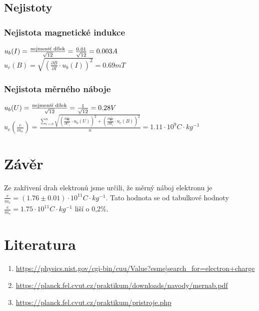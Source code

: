 \documentclass[11pt, a4paper]{report}
\begin{document}
\section{Nejistoty}
\subsection{Nejistota magnetické indukce}
\begin{center}
	\Large
	$u_b(I) = \frac{\textnormal{nejmenší dílek}}{\sqrt{12}}=\frac{0.01}{\sqrt{12}} = 0.003A$\\
	\vspace{0.2cm}
	$u_c(B) = \sqrt{(\frac{\partial B}{\partial I}\cdot u_b(I))^2}=0.69 mT$\\
\end{center}
\subsection{Nejistota měrného náboje}
\begin{center}
	\Large
	$u_b(U) = \frac{\textnormal{nejmenší dílek}}{\sqrt{12}}=\frac{1}{\sqrt{12}} = 0.28V$\\
	\vspace{0.5cm}
	\LARGE
	$u_c(\frac{e}{m_e})=\frac{\sum_{i=0}^{n}\sqrt{(\frac{\partial \frac{e}{m_e}}{\partial U_i}\cdot u_b(U))^2+(\frac{\partial \frac{e}{m_e}}{\partial B_i }\cdot u_c(B))^2}}{n}= 1.11\cdot 10^{9} C\cdot kg^{-1}$
\end{center}
\chapter{Závěr}
Ze zakřivení drah elektronů jsme určili, že měrný náboj elektronu je \mbox{$\frac{e}{m_e} = (1.76\pm0.01) \cdot 10^{11} C\cdot kg^{-1}$}.
Tato hodnota se od tabulkové hodnoty $\frac{e}{m_e} = 1.75\cdot 10^{11} C\cdot kg^{-1}$ liší o 0,2\%.

\chapter{Literatura}
\begin{enumerate}
	\item \url{https://physics.nist.gov/cgi-bin/cuu/Value?esme|search_for=electron+charge}
	\item \url{https://planck.fel.cvut.cz/praktikum/downloads/navody/mernab.pdf}
	\item \url{https://planck.fel.cvut.cz/praktikum/pristroje.php}
\end{enumerate}
\end{document}
